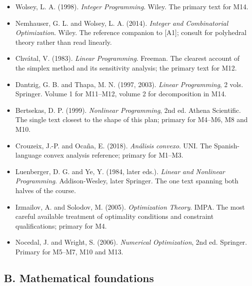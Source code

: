 \documentclass[11pt,a4paper]{article}
\begin{document}
\begin{itemize}[label={}]
\item[{[A1]}] Wolsey, L. A. (1998). \emph{Integer Programming}. Wiley. The primary text for
M14.
\item[{[A2]}] Nemhauser, G. L. and Wolsey, L. A. (2014). \emph{Integer and Combinatorial
Optimization}. Wiley. The reference companion to [A1]; consult for polyhedral theory rather
than read linearly.
\item[{[A3]}] Chv\'atal, V. (1983). \emph{Linear Programming}. Freeman. The clearest account of
the simplex method and its sensitivity analysis; the primary text for M12.
\item[{[A4]}] Dantzig, G. B. and Thapa, M. N. (1997, 2003). \emph{Linear Programming}, 2 vols.
Springer. Volume 1 for M11--M12, volume 2 for decomposition in M14.
\item[{[A5]}] Bertsekas, D. P. (1999). \emph{Nonlinear Programming}, 2nd ed. Athena Scientific.
The single text closest to the shape of this plan; primary for M4--M6, M8 and M10.
\item[{[A6]}] Crouzeix, J.-P. and Oca\~na, E. (2018). \emph{An\'alisis convexo}. UNI. The
Spanish-language convex analysis reference; primary for M1--M3.
\item[{[A7]}] Luenberger, D. G. and Ye, Y. (1984, later eds.). \emph{Linear and Nonlinear
Programming}. Addison-Wesley, later Springer. The one text spanning both halves of the course.
\item[{[A8]}] Izmailov, A. and Solodov, M. (2005). \emph{Optimization Theory}. IMPA. The most
careful available treatment of optimality conditions and constraint qualifications; primary for
M4.
\item[{[A9]}] Nocedal, J. and Wright, S. (2006). \emph{Numerical Optimization}, 2nd ed.
Springer. Primary for M5--M7, M10 and M13.
\end{itemize}

\subsection*{B. Mathematical foundations}
\end{document}
